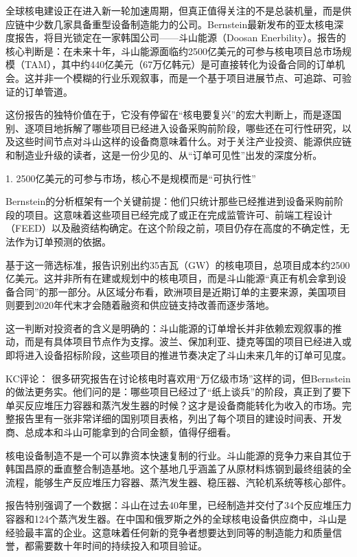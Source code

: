 \documentclass[11pt]{ctexart}
\begin{document}
全球核电建设正在进入新一轮加速周期，但真正值得关注的不是总装机量，而是供应链中少数几家具备重型设备制造能力的公司。Bernstein最新发布的亚太核电深度报告，将目光锁定在一家韩国公司——斗山能源（Doosan Enerbility）。报告的核心判断是：在未来十年，斗山能源面临约2500亿美元的可参与核电项目总市场规模（TAM），其中约440亿美元（67万亿韩元）是可直接转化为设备合同的订单机会。这并非一个模糊的行业乐观叙事，而是一个基于项目进展节点、可追踪、可验证的订单管道。

这份报告的独特价值在于，它没有停留在“核电要复兴”的宏大判断上，而是逐国别、逐项目地拆解了哪些项目已经进入设备采购前阶段，哪些还在可行性研究，以及这些时间节点对斗山这样的设备商意味着什么。对于关注产业投资、能源供应链和制造业升级的读者，这是一份少见的、从“订单可见性”出发的深度分析。

1. 2500亿美元的可参与市场，核心不是规模而是“可执行性”

Bernstein的分析框架有一个关键前提：他们只统计那些已经推进到设备采购前阶段的项目。这意味着这些项目已经完成了或正在完成监管许可、前端工程设计（FEED）以及融资结构确定。在这个阶段之前，项目仍存在高度的不确定性，无法作为订单预测的依据。

基于这一筛选标准，报告识别出约35吉瓦（GW）的核电项目，总项目成本约2500亿美元。这并非所有在建或规划中的核电项目，而是斗山能源“真正有机会拿到设备合同”的那一部分。从区域分布看，欧洲项目是近期订单的主要来源，美国项目则要到2020年代末才会随着融资和供应链支持改善而逐步落地。

这一判断对投资者的含义是明确的：斗山能源的订单增长并非依赖宏观叙事的推动，而是有具体项目节点作为支撑。波兰、保加利亚、捷克等国的项目已经进入或即将进入设备招标阶段，这些项目的推进节奏决定了斗山未来几年的订单可见度。

KC评论： 很多研究报告在讨论核电时喜欢用“万亿级市场”这样的词，但Bernstein的做法更务实。他们问的是：哪些项目已经过了“纸上谈兵”的阶段，真正到了要下单买反应堆压力容器和蒸汽发生器的时候？这才是设备商能转化为收入的市场。完整报告里有一张非常详细的国别项目表格，列出了每个项目的建设时间表、开发商、总成本和斗山可能拿到的合同金额，值得仔细看。

核电设备制造不是一个可以靠资本快速复制的行业。斗山能源的竞争力来自其位于韩国昌原的垂直整合制造基地。这个基地几乎涵盖了从原材料炼钢到最终组装的全流程，能够生产反应堆压力容器、蒸汽发生器、稳压器、汽轮机系统等核心部件。

报告特别强调了一个数据：斗山在过去40年里，已经制造并交付了34个反应堆压力容器和124个蒸汽发生器。在中国和俄罗斯之外的全球核电设备供应商中，斗山是经验最丰富的企业。这意味着任何新的竞争者想要达到同等的制造能力和质量信誉，都需要数十年时间的持续投入和项目验证。
\end{document}
